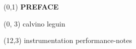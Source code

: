 \documentclass[10pt]{article}
\begin{document}
\begin{textblock}{23}(0,1)
    \center\huge\textbf{PREFACE}
\end{textblock}

\begin{textblock}{11}(0, 3)
    {calvino}
    {leguin}
\end{textblock}

\begin{textblock}{11}(12,3)
    {instrumentation}
    {performance-notes}
\end{textblock}
\end{document}
